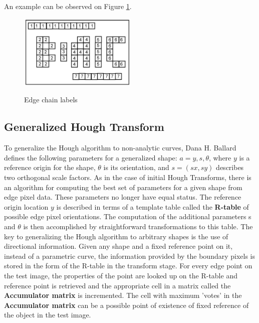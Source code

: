 \documentclass[letterpaper,12pt]{article}
\begin{document}
An example can be observed on Figure \ref{fig:edge_chain_labs}.

\begin{figure}[!th]
  \centering
  {\includegraphics[width=0.5\textwidth]{edge_chain_labs}}

    \caption{Edge chain labels  	\label{fig:edge_chain_labs}}
  \end{figure}


\subsection{Generalized Hough Transform}


To generalize the Hough algorithm to non-analytic curves,  Dana H. Ballard defines the following parameters for a generalized shape: $a={y,s,θ}$, where $y$ is a reference origin for the shape, $\theta$ is its orientation, and $s = (sx, sy)$ describes two orthogonal scale factors. As in the case of initial Hough Transforms, there is an algorithm for computing the best set of parameters for a given shape from edge pixel data. These parameters no longer have equal status. The reference origin location $y$ is described in terms of a template table called the \textbf{R-table} of possible edge pixel orientations. The computation of the additional parameters s and $\theta$ is then accomplished by straightforward transformations to this table. The key to generalizing the Hough algorithm to arbitrary shapes is the use of directional information. Given any shape and a fixed reference point on it, instead of a parametric curve, the information provided by the boundary pixels is stored in the form of the R-table in the transform stage. For every edge point on the test image, the properties of the point are looked up on the R-table and reference point is retrieved and the appropriate cell in a matrix called the \textbf{Accumulator matrix} is incremented. The cell with maximum 'votes' in the \textbf{Accumulator matrix} can be a possible point of existence of fixed reference of the object in the test image.

%
\end{document}
